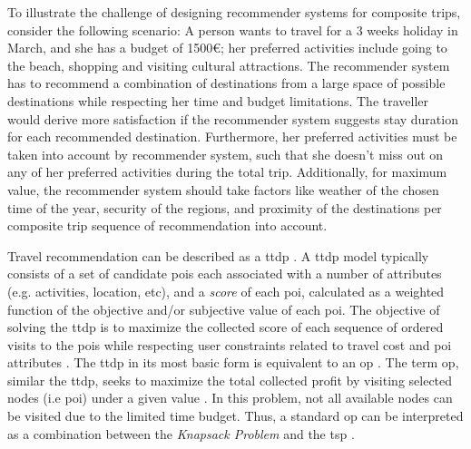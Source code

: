 To illustrate the challenge of designing recommender systems for composite trips, consider the following scenario: A person wants to travel for a 3 weeks holiday in March, and she has a budget of 1500€; her preferred activities include going to the beach, shopping and visiting cultural attractions. The recommender system has to recommend a combination of destinations from a large space of possible destinations while respecting her time and budget limitations. The traveller would derive more satisfaction if the recommender system suggests stay duration for each recommended destination. Furthermore, her preferred activities must be taken into account by recommender system, such that she doesn't miss out on any of her preferred activities during the total trip. Additionally, for maximum value, the recommender system should take factors like weather of the chosen time of the year, security of the regions, and proximity of the destinations per composite trip sequence of recommendation into account. 

Travel recommendation can be described as a \gls{ttdp} \parencite{Vansteenwegen2007TheOpportunity}. A \gls{ttdp} model typically consists of a set of candidate \glspl{poi} each associated with a number of attributes (e.g. activities, location, etc), and a \textit{score} of each \gls{poi}, calculated as a weighted function of the objective and/or subjective value of each \gls{poi}. The objective of solving the \gls{ttdp} is to maximize the collected score of each sequence of ordered visits to the \glspl{poi} while respecting user constraints related to travel cost and \gls{poi} attributes \parencite{Survey_TTDP_Guavalas}. The \gls{ttdp} in its most basic form is equivalent to an \gls{op} \parencite{Vansteenwegen2007TheOpportunity}. The term \gls{op}, similar the \gls{ttdp}, seeks to maximize the total collected profit by visiting selected nodes (i.e \gls{poi}) under a given value \parencite{T.1984HeuristicOrienteering}. In this problem, not all available nodes can be visited due to the limited time budget. Thus, a standard \gls{op} can be interpreted as a combination between the \textit{Knapsack Problem} and the \gls{tsp} \parencite{OP_Solution_Gunawan}. 

